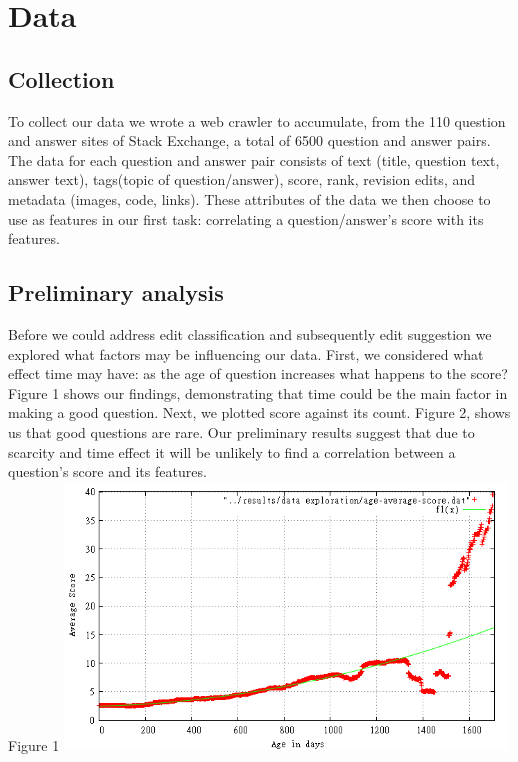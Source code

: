 \documentclass[11pt, oneside]{article}   	%
\begin{document}
\section{Data}
\subsection{Collection}
To collect our data we wrote a web crawler to accumulate, from the 110 question and answer sites of Stack Exchange, a total of 6500 question and answer pairs. The data for each question and answer pair consists of text (title, question text, answer text), tags(topic of question/answer), score, rank, revision edits, and metadata (images, code, links). These attributes of the data we then choose to use as features in our first task: correlating a question/answer's score with its features. 

\subsection{Preliminary analysis}
Before we could address edit classification and subsequently edit suggestion we explored what factors may be influencing our data. First, we considered what effect time may have: as the age of question increases what happens to the score? Figure 1 shows our findings, demonstrating that time could be the main factor in making a good question. Next, we plotted score against its count. Figure 2, shows us that good questions are rare. Our preliminary results suggest that due to scarcity and time effect it will be unlikely to find a correlation between a question's score and its features. \\

\centering 
Figure 1
\includegraphics[height=2.8in, width=\textwidth]{age-average-score}
\end{document}
